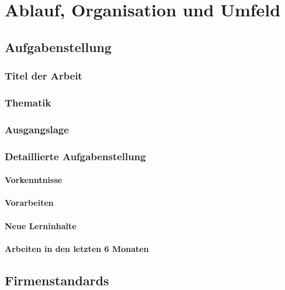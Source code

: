 \part[Ablauf, Organisation und Umfeld]{Ablauf, Organisation und Umfeld
    }

\tableofcontents

\chapter{Aufgabenstellung}

\section{Titel der Arbeit}

\section{Thematik}

\section{Ausgangslage}

\section{Detaillierte Aufgabenstellung}

\subsection{Vorkenntnisse}

\subsection{Vorarbeiten}

\subsection{Neue Lerninhalte}

\subsection{Arbeiten in den letzten 6 Monaten}

\chapter{Firmenstandards}

